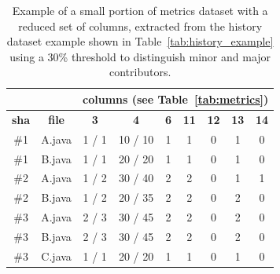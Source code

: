 \begin{table}[ht]
\centering
\footnotesize
\begin{tabular}{|c|c|c|c|c|c|c|c|c|}
\cline{3-9}
\multicolumn{1}{c}{} & 
\multicolumn{1}{c}{} & \multicolumn{7}{|c|}{\textbf{columns (see Table~\ref{tab:metrics})}} \\
\hline
\textbf{sha} & \textbf{file} & \textbf{3} & \textbf{4} & \textbf{6} & \textbf{11} & \textbf{12} & \textbf{13} & \textbf{14}
\\
\hline
\#1 & A.java & 1 / 1             & 10 / 10                & 1                   & 1                   & 0                   & 1                                 & 0                                 \\
\#1 & B.java & 1 / 1             & 20 / 20                & 1                   & 1                   & 0                   & 1                                 & 0                                 \\
\#2 & A.java & 1 / 2             & 30 / 40                & 2                   & 2                   & 0                   & 1                                 & 1                                 \\
\#2 & B.java & 1 / 2             & 20 / 35                & 2                   & 2                   & 0                   & 2                                 & 0                                 \\
\#3 & A.java & 2 / 3             & 30 / 45                & 2                   & 2                   & 0                   & 2                                 & 0                                 \\
\#3 & B.java & 2 / 3             & 30 / 45                & 2                   & 2                   & 0                   & 2                                 & 0                                 \\
\#3 & C.java & 1 / 1             & 20 / 20                & 1                   & 1                   & 0                   & 1                                 & 0                 
\\ \hline
\end{tabular}
\caption{Example of a small portion of metrics dataset with a reduced set of columns, extracted from the history dataset example shown in Table~\ref{tab:history_example} using a 30\% threshold to distinguish minor and major contributors.}
\label{tab:metrics_example}
\end{table}




